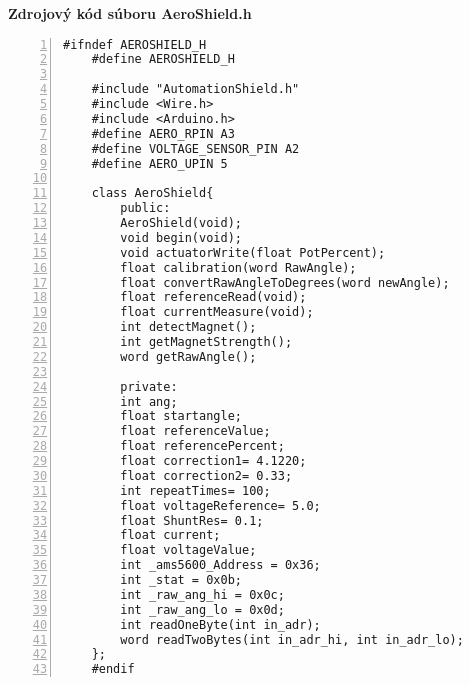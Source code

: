 \LARGE\bf{Zdrojový kód súboru AeroShield.h}
\label{AeroShield.h}
\vspace{1cm}
\begin{lstlisting}[numbers=left,basicstyle=\scriptsize,caption={Zdrojový kód súboru AeroShield.h.},captionpos=b,]	
	#ifndef AEROSHIELD_H			 
	#define AEROSHIELD_H	
	
	#include "AutomationShield.h" 
	#include <Wire.h>              
	#include <Arduino.h>			 
	#define AERO_RPIN A3        
	#define VOLTAGE_SENSOR_PIN A2   
	#define AERO_UPIN 5   
	
	class AeroShield{		    	               
		public:
		AeroShield(void);
		void begin(void);                                       
		void actuatorWrite(float PotPercent);          
		float calibration(word RawAngle);          
		float convertRawAngleToDegrees(word newAngle);  
		float referenceRead(void);
		float currentMeasure(void);
		int detectMagnet();	
		int getMagnetStrength();
		word getRawAngle();
		
		private:
		int ang;                                        
		float startangle;                              
		float referenceValue;               
		float referencePercent;              
		float correction1= 4.1220;			
		float correction2= 0.33;			
		int repeatTimes= 100;				
		float voltageReference= 5.0;		
		float ShuntRes= 0.1;				
		float current;						
		float voltageValue;				
		int _ams5600_Address = 0x36;	
		int _stat = 0x0b;				
		int _raw_ang_hi = 0x0c;		
		int _raw_ang_lo = 0x0d;		
		int readOneByte(int in_adr);	
		word readTwoBytes(int in_adr_hi, int in_adr_lo); 
	};
	#endif
\end{lstlisting}